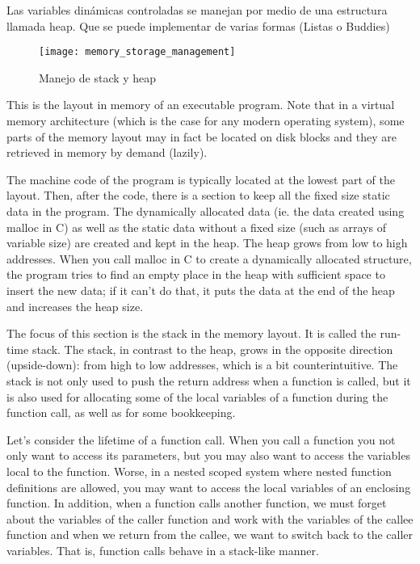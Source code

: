 \documentclass[a4paper, twoside]{article}
\begin{document}
Las variables dinámicas controladas se manejan por medio de una estructura
llamada heap.
Que se puede implementar de varias formas (Listas o Buddies)

\begin{figure}[h]
  \centering
  \texttt{[image: memory\_storage\_management]}
  \caption{Manejo de stack y heap}
  \label{fig:memory_storage_management}
\end{figure}

This is the layout in memory of an executable program.
Note that in a virtual memory architecture (which is the case for any modern
operating system), some parts of the memory layout may in fact be located on
disk blocks and they are retrieved in memory by demand (lazily).

The machine code of the program is typically located at the lowest part of
the layout.
Then, after the code, there is a section to keep all the fixed size static data
in the program.
The dynamically allocated data (ie. the data created using malloc in C) as
well as the static data without a fixed size (such as arrays of variable size)
are created and kept in the heap.
The heap grows from low to high addresses.
When you call malloc in C to create a dynamically allocated structure,
the program tries to find an empty place in the heap with sufficient space to
insert the new data; if it can't do that, it puts the data at the end of the
heap and increases the heap size.

The focus of this section is the stack in the memory layout.
It is called the run-time stack.
The stack, in contrast to the heap, grows in the opposite direction
(upside-down): from high to low addresses, which is a bit counterintuitive.
The stack is not only used to push the return address when a function is
called, but it is also used for allocating some of the local variables of
a function during the function call, as well as for some bookkeeping.

Let's consider the lifetime of a function call.
When you call a function you not only want to access its parameters, but you
may also want to access the variables local to the function.
Worse, in a nested scoped system where nested function definitions are allowed,
you may want to access the local variables of an enclosing function.
In addition, when a function calls another function, we must forget about
the variables of the caller function and work with the variables of the callee
function and when we return from the callee, we want to switch back to the
caller variables.
That is, function calls behave in a stack-like manner.
\end{document}
